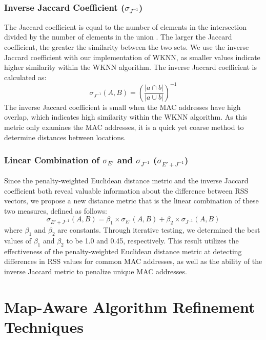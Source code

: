 \documentclass[conference]{IEEEtran}
\begin{document}
\subsubsection{Inverse Jaccard Coefficient ($\sigma_{J^{-1}}$)}
\indent The Jaccard coefficient is equal to the number of elements in the intersection divided by the number of elements in the union \cite{Dunbar}. The larger the Jaccard coefficient, the greater the similarity between the two sets. We use the inverse Jaccard coefficient with our implementation of WKNN, as smaller values indicate higher similarity within the WKNN algorithm. The inverse Jaccard coefficient is calculated as: 
\begin{equation}
\label{eq:jaccard}
\sigma_{J^{-1}}(A, B) = \left(\frac{|a\cap b|}{|a\cup b|}\right)^{-1}
\end{equation}
The inverse Jaccard coefficient is small when the MAC addresses have high overlap, which indicates high similarity within the WKNN algorithm. As this metric only examines the MAC addresses, it is a quick yet coarse method to determine distances between locations.

\subsubsection{Linear Combination of $\sigma_{E'}$ and $\sigma_{J^{-1}}$ ($\sigma_{E' + J^{-1}}$)}
\indent Since the penalty-weighted Euclidean distance metric and the inverse Jaccard coefficient both reveal valuable information about the difference between RSS vectors, we propose a new distance metric that is the linear combination of these two measures, defined as follows:
\begin{equation}
\label{eq:combined}
\sigma_{E'+J^{-1}}(A, B) = \beta_1\times\sigma_{E'}(A, B)+\beta_2\times\sigma_{J^{-1}}(A, B)
\end{equation}
where $\beta_1$ and $\beta_2$ are constants. Through iterative testing, we determined the best values of $\beta_1$ and $\beta_2$ to be 1.0 and 0.45, respectively. This result utilizes the effectiveness of the penalty-weighted Euclidean distance metric at detecting differences in RSS values for common MAC addresses, as well as the ability of the inverse Jaccard metric to penalize unique MAC addresses.

\section{Map-Aware Algorithm Refinement Techniques}
\end{document}
